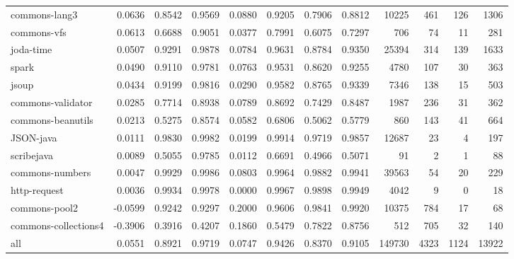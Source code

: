 \begin{table*}
\begin{tabular}{lrrrrrrrrrrr}
          commons-lang3 &      0.0636 &  0.8542 &     0.9569 &     0.0880 &  0.9205 &     0.7906 &   0.8812 &   10225 &   461 &   126 &   1306 \\
            commons-vfs &      0.0613 &  0.6688 &     0.9051 &     0.0377 &  0.7991 &     0.6075 &   0.7297 &     706 &    74 &    11 &    281 \\
              joda-time &      0.0507 &  0.9291 &     0.9878 &     0.0784 &  0.9631 &     0.8784 &   0.9350 &   25394 &   314 &   139 &   1633 \\
                  spark &      0.0490 &  0.9110 &     0.9781 &     0.0763 &  0.9531 &     0.8620 &   0.9255 &    4780 &   107 &    30 &    363 \\
                  jsoup &      0.0434 &  0.9199 &     0.9816 &     0.0290 &  0.9582 &     0.8765 &   0.9339 &    7346 &   138 &    15 &    503 \\
      commons-validator &      0.0285 &  0.7714 &     0.8938 &     0.0789 &  0.8692 &     0.7429 &   0.8487 &    1987 &   236 &    31 &    362 \\
      commons-beanutils &      0.0213 &  0.5275 &     0.8574 &     0.0582 &  0.6806 &     0.5062 &   0.5779 &     860 &   143 &    41 &    664 \\
              JSON-java &      0.0111 &  0.9830 &     0.9982 &     0.0199 &  0.9914 &     0.9719 &   0.9857 &   12687 &    23 &     4 &    197 \\
             scribejava &      0.0089 &  0.5055 &     0.9785 &     0.0112 &  0.6691 &     0.4966 &   0.5071 &      91 &     2 &     1 &     88 \\
        commons-numbers &      0.0047 &  0.9929 &     0.9986 &     0.0803 &  0.9964 &     0.9882 &   0.9941 &   39563 &    54 &    20 &    229 \\
           http-request &      0.0036 &  0.9934 &     0.9978 &     0.0000 &  0.9967 &     0.9898 &   0.9949 &    4042 &     9 &     0 &     18 \\
          commons-pool2 &     -0.0599 &  0.9242 &     0.9297 &     0.2000 &  0.9606 &     0.9841 &   0.9920 &   10375 &   784 &    17 &     68 \\
   commons-collections4 &     -0.3906 &  0.3916 &     0.4207 &     0.1860 &  0.5479 &     0.7822 &   0.8756 &     512 &   705 &    32 &    140 \\
                    all &      0.0551 &  0.8921 &     0.9719 &     0.0747 &  0.9426 &     0.8370 &   0.9105 &  149730 &  4323 &  1124 &  13922 \\
\bottomrule
\end{tabular}
\end{table*}
